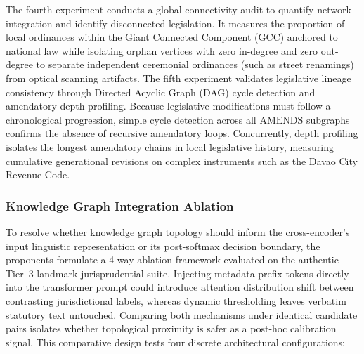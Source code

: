         The fourth experiment conducts a global connectivity audit to quantify network integration and identify disconnected legislation. It measures the proportion of local ordinances within the Giant Connected Component (GCC) anchored to national law while isolating orphan vertices with zero in-degree and zero out-degree to separate independent ceremonial ordinances (such as street renamings) from optical scanning artifacts. The fifth experiment validates legislative lineage consistency through Directed Acyclic Graph (DAG) cycle detection and amendatory depth profiling. Because legislative modifications must follow a chronological progression, simple cycle detection across all $\text{AMENDS}$ subgraphs confirms the absence of recursive amendatory loops. Concurrently, depth profiling isolates the longest amendatory chains in local legislative history, measuring cumulative generational revisions on complex instruments such as the Davao City Revenue Code.

        \subsubsection{Knowledge Graph Integration Ablation}
        \label{sec:kg_integration_ablation_methodology}
        To resolve whether knowledge graph topology should inform the cross-encoder's input linguistic representation or its post-softmax decision boundary, the proponents formulate a 4-way ablation framework evaluated on the authentic Tier~3 landmark jurisprudential suite. Injecting metadata prefix tokens directly into the transformer prompt could introduce attention distribution shift between contrasting jurisdictional labels, whereas dynamic thresholding leaves verbatim statutory text untouched. Comparing both mechanisms under identical candidate pairs isolates whether topological proximity is safer as a post-hoc calibration signal. This comparative design tests four discrete architectural configurations:

